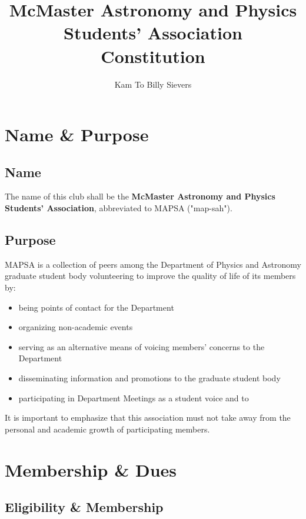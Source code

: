 \documentclass[twocolumn,reprint,nofootinbib,longbibliography,prd,superscriptaddress]{revtex4-2}
\begin{document}
		
\title{McMaster Astronomy and Physics Students' Association\\\huge{Constitution}}


\author{Kam To Billy Sievers}
\maketitle
\section{Name \& Purpose}
\subsection{Name}The name of this club shall be the \textbf{McMaster Astronomy and Physics Students' Association}, abbreviated to MAPSA ("map-sah").
\subsection{Purpose}
MAPSA is a collection of peers among the Department of Physics and Astronomy graduate student body volunteering to improve the quality of life of its members by: 
\begin{itemize}
	\item being points of contact for the Department
	\item organizing non-academic events 
	\item serving as an alternative means of voicing members' concerns to the Department
	\item disseminating information and promotions to the graduate student body
	\item participating in Department Meetings as a student voice and to 
\end{itemize}


It is important to emphasize that this association must not take away from the personal and academic growth of participating members.

\section{Membership \& Dues}
\subsection{Eligibility \& Membership}
\end{document}

